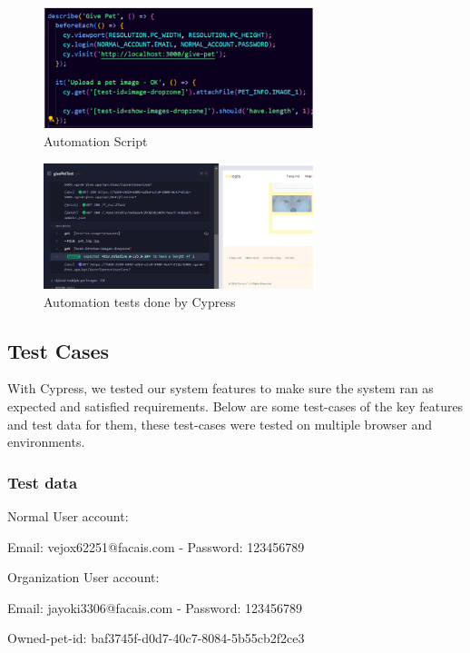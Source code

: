 \begin{figure}[H]
    \centering
    \includegraphics[width=0.7\textwidth]{Figures/cypress_script.png}
    \caption{Automation Script}
    \label{fig:cypress-script}
\end{figure}

\begin{figure}[H]
    \centering
    \includegraphics[width=0.7\textwidth]{Figures/cypress_auto.png}
    \caption{Automation tests done by Cypress}
    \label{fig:cypress-test}
\end{figure}

\subsection{Test Cases}
With Cypress, we tested our system features to make sure the system ran as expected and satisfied requirements. Below are some test-cases of the key features and test data for them, these test-cases were tested on multiple browser and environments.

\subsubsection*{Test data}

Normal User account:

\quad Email: vejox62251@facais.com - Password: 123456789

Organization User account:

\quad Email:  jayoki3306@facais.com - Password: 123456789

Owned-pet-id: baf3745f-d0d7-40c7-8084-5b55cb2f2ce3

